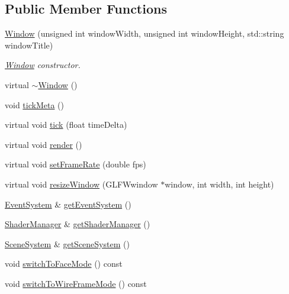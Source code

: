 \subsection*{Public Member Functions}
\begin{DoxyCompactItemize}
\item 
\mbox{\hyperlink{classec_1_1_window_a01bb029fa4964caf70553c5ca806d8cc}{Window}} (unsigned int window\+Width, unsigned int window\+Height, std\+::string window\+Title)
\begin{DoxyCompactList}\small\item\em \mbox{\hyperlink{classec_1_1_window}{Window}} constructor. \end{DoxyCompactList}\item 
virtual \mbox{\hyperlink{classec_1_1_window_a639d3f230ca0e232066b4c61a5a212b7}{$\sim$\+Window}} ()
\item 
void \mbox{\hyperlink{classec_1_1_window_a0adaafc13d0dafc238aa0aaa0f5f4f82}{tick\+Meta}} ()
\item 
virtual void \mbox{\hyperlink{classec_1_1_window_a093b4989e4cd12cf9e62777ec4ef8661}{tick}} (float time\+Delta)
\item 
virtual void \mbox{\hyperlink{classec_1_1_window_acb066b817adc7c790b0810695078dee3}{render}} ()
\item 
virtual void \mbox{\hyperlink{classec_1_1_window_a6acc36f2c069b5e38f522953ca52ce9f}{set\+Frame\+Rate}} (double fps)
\item 
virtual void \mbox{\hyperlink{classec_1_1_window_a33ef071f4198715ae42844c681fb40eb}{resize\+Window}} (G\+L\+F\+Wwindow $\ast$window, int width, int height)
\item 
\mbox{\hyperlink{classec_1_1_event_system}{Event\+System}} \& \mbox{\hyperlink{classec_1_1_window_a9dda11a247352aa51fea720076174535}{get\+Event\+System}} ()
\item 
\mbox{\hyperlink{classec_1_1_shader_manager}{Shader\+Manager}} \& \mbox{\hyperlink{classec_1_1_window_adc63f54684ad3681c0d4bea8481b6322}{get\+Shader\+Manager}} ()
\item 
\mbox{\hyperlink{classec_1_1_scene_system}{Scene\+System}} \& \mbox{\hyperlink{classec_1_1_window_a13d8cba249c2de0a5366c2507e887290}{get\+Scene\+System}} ()
\item 
void \mbox{\hyperlink{classec_1_1_window_a071d133719298221af21bd2c207733b3}{switch\+To\+Face\+Mode}} () const
\item 
void \mbox{\hyperlink{classec_1_1_window_a85be553f3f877b77ac70db32b9f8a8f6}{switch\+To\+Wire\+Frame\+Mode}} () const

\end{DoxyCompactItemize}
